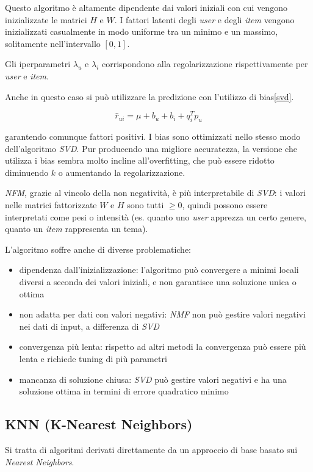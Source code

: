 Questo algoritmo è altamente dipendente dai valori iniziali con cui vengono inizializzate le matrici $H$ e $W$. I fattori latenti degli \textit{user} e degli \textit{item} vengono inizializzati casualmente in modo uniforme tra un minimo e un massimo, solitamente nell'intervallo $[0, 1]$.

Gli iperparametri $\lambda_u$ e $\lambda_i$ corrispondono alla regolarizzazione rispettivamente per \textit{user} e \textit{item}.

Anche in questo caso si può utilizzare la predizione con l'utilizzo di bias\ref{svd}.

\[
\hat{r}_{ui} = \mu + b_u + b_i + q_i^T p_u
\]

garantendo comunque fattori positivi. I bias sono ottimizzati nello stesso modo dell'algoritmo \textit{SVD}. Pur producendo una migliore accuratezza, la versione che utilizza i bias sembra molto incline all'overfitting, che può essere ridotto diminuendo $k$ o aumentando la regolarizzazione.

\textit{NFM}, grazie al vincolo della non negatività, è più interpretabile di \textit{SVD}: i valori nelle matrici fattorizzate $W$ e $H$ sono tutti $\geq 0$, quindi possono essere interpretati come pesi o intensità (es. quanto uno \textit{user} apprezza un certo genere, quanto un \textit{item} rappresenta un tema).

L'algoritmo soffre anche di diverse problematiche:

\begin{itemize}
    \item dipendenza dall'inizializzazione: l'algoritmo può convergere a minimi locali diversi a seconda dei valori iniziali, e non garantisce una soluzione unica o ottima
    
    \item non adatta per dati con valori negativi: \textit{NMF} non può gestire valori negativi nei dati di input, a differenza di \textit{SVD}
    \item convergenza più lenta: rispetto ad altri metodi la convergenza può essere più lenta e richiede tuning di più parametri
    \item mancanza di soluzione chiusa: \textit{SVD} può gestire valori negativi e ha una soluzione ottima in termini di errore quadratico minimo
\end{itemize}

\subsection{KNN (K-Nearest Neighbors)}\label{knn}
Si tratta di algoritmi derivati direttamente da un approccio di base basato sui \textit{Nearest Neighbors}.

